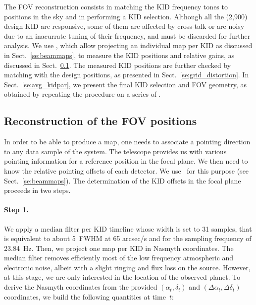 
The FOV reconstruction consists in matching the KID frequency tones
to positions in the sky and in performing a KID selection. Although all
the (2,900) design KID are responsive, some of them are affected by
cross-talk or are noisy due to an inacurrate tuning of their
frequency, and must be discarded for further analysis. We use \bms,
which allow projecting an individual map per KID as discussed in
Sect.~\ref{se:beammaps}, to measure the KID positions and relative gains, as
discussed in Sect.~\ref{se:fov_geometry}. The measured KID positions
are further
checked by matching with the design positions, as presented in
Sect.~\ref{se:grid_distortion}. In Sect.~\ref{se:avg_kidpar}, we
present the final KID selection and FOV geometry, as obtained by
repeating the procedure on a series of \bms.  



\subsection{Reconstruction of the FOV positions}
\label{se:fov_geometry}

In order to be able to produce a map, one needs to associate a pointing
direction to any data sample of the system. The telescope provides us with
various pointing information for a reference position in the focal plane. We
then need to know the relative pointing offsets of each detector. We use
\bms\ for this purpose (see Sect.~\ref{se:beammaps}). The determination of the
KID offsets in the focal plane proceeds in two steps.

\paragraph{Step 1.} We apply a median filter per
KID timeline whose width is set to 31 samples, that is equivalent to
about 5~FWHM at 65 arcsec/s and for the sampling frequency of
23.84~Hz. Then, we project one map per KID in Nasmyth
coordinates. The median filter removes
efficiently most of the low frequency atmospheric and electronic
noise, albeit with a slight ringing and flux loss on the
source. However, at this stage, we are only interested in the location
of the observed planet.
To derive the Nasmyth coordinates from the
provided $(\alpha_t,\delta_t)$ and $(\Delta\alpha_t,\Delta\delta_t)$
coordinates, we build the following quantities at time~$t$:

